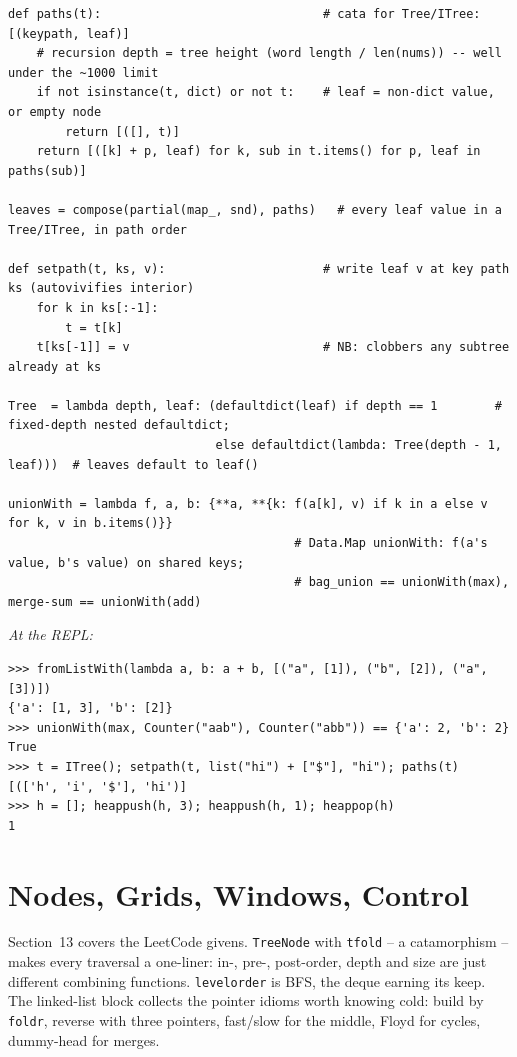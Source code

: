 \documentclass[11pt,letterpaper]{book}
\begin{document}
\begin{lstlisting}[style=code]
def paths(t):                               # cata for Tree/ITree: [(keypath, leaf)]
    # recursion depth = tree height (word length / len(nums)) -- well under the ~1000 limit
    if not isinstance(t, dict) or not t:    # leaf = non-dict value, or empty node
        return [([], t)]
    return [([k] + p, leaf) for k, sub in t.items() for p, leaf in paths(sub)]

leaves = compose(partial(map_, snd), paths)   # every leaf value in a Tree/ITree, in path order

def setpath(t, ks, v):                      # write leaf v at key path ks (autovivifies interior)
    for k in ks[:-1]:
        t = t[k]
    t[ks[-1]] = v                           # NB: clobbers any subtree already at ks

Tree  = lambda depth, leaf: (defaultdict(leaf) if depth == 1        # fixed-depth nested defaultdict;
                             else defaultdict(lambda: Tree(depth - 1, leaf)))  # leaves default to leaf()

unionWith = lambda f, a, b: {**a, **{k: f(a[k], v) if k in a else v for k, v in b.items()}}
                                        # Data.Map unionWith: f(a's value, b's value) on shared keys;
                                        # bag_union == unionWith(max), merge-sum == unionWith(add)
\end{lstlisting}

\noindent\textit{At the REPL:}
\begin{lstlisting}[style=spec]
>>> fromListWith(lambda a, b: a + b, [("a", [1]), ("b", [2]), ("a", [3])])
{'a': [1, 3], 'b': [2]}
>>> unionWith(max, Counter("aab"), Counter("abb")) == {'a': 2, 'b': 2}
True
>>> t = ITree(); setpath(t, list("hi") + ["$"], "hi"); paths(t)
[(['h', 'i', '$'], 'hi')]
>>> h = []; heappush(h, 3); heappush(h, 1); heappop(h)
1
\end{lstlisting}
\chapter{Nodes, Grids, Windows, Control}

Section~13 covers the LeetCode givens. \texttt{TreeNode} with \texttt{tfold} --
a catamorphism -- makes every traversal a one-liner: in-, pre-, post-order,
depth and size are just different combining functions. \texttt{levelorder} is
BFS, the deque earning its keep. The linked-list block collects the pointer
idioms worth knowing cold: build by \texttt{foldr}, reverse with three
pointers, fast/slow for the middle, Floyd for cycles, dummy-head for merges.
\end{document}
